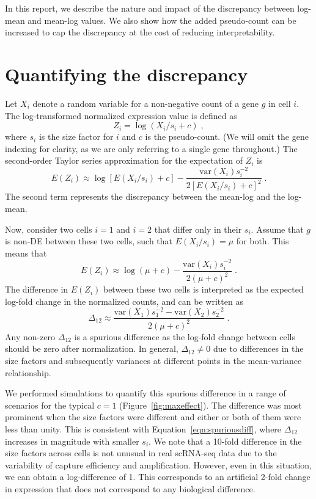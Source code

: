 \documentclass[10pt,letterpaper]{article}
\begin{document}
In this report, we describe the nature and impact of the discrepancy between log-mean and mean-log values.
We also show how the added pseudo-count can be increased to cap the discrepancy at the cost of reducing interpretability.

\section{Quantifying the discrepancy}
Let $X_i$ denote a random variable for a non-negative count of a gene $g$ in cell $i$.
The log-transformed normalized expression value is defined as 
\[
Z_i = \log(X_i / s_i + c) \;,
\]
where $s_i$ is the size factor for $i$ and $c$ is the pseudo-count.
(We will omit the gene indexing for clarity, as we are only referring to a single gene throughout.)
The second-order Taylor series approximation for the expectation of $Z_i$ is
\[
E(Z_i) \approx \log[E(X_i/s_i) + c] - \frac{\mbox{var}(X_i)s_i^{-2}}{2[E(X_i/s_i) + c]^2} \;.
\]
The second term represents the discrepancy between the mean-log and the log-mean.

Now, consider two cells $i=1$ and $i=2$ that differ only in their $s_i$.
Assume that $g$ is non-DE between these two cells, such that $E(X_i/s_i)=\mu$ for both.
This means that
\[
E(Z_i) \approx \log(\mu + c) - \frac{\mbox{var}(X_i)s_i^{-2}}{2(\mu + c)^2} \;.
\]
The difference in $E(Z_i)$ between these two cells is interpreted as the expected log-fold change in the normalized counts, and can be written as
\begin{equation}
\Delta_{12} \approx \frac{\mbox{var}(X_1)s_1^{-2} -  \mbox{var}(X_2)s_2^{-2}}{2(\mu + c)^2} \;. \label{eqn:spuriousdiff}
\end{equation}
Any non-zero $\Delta_{12}$ is a spurious difference as the log-fold change between cells should be zero after normalization.
In general, $\Delta_{12}\neq 0$ due to differences in the size factors and subsequently variances at different points in the mean-variance relationship.

We performed simulations to quantify this spurious difference in a range of scenarios for the typical $c=1$ (Figure~\ref{fig:maxeffect}).
The difference was most prominent when the size factors were different and either or both of them were less than unity.
This is consistent with Equation~\ref{eqn:spuriousdiff}, where $\Delta_{12}$ increases in magnitude with smaller $s_i$.
We note that a 10-fold difference in the size factors across cells is not unusual in real scRNA-seq data \cite{lun2016pooling} due to the variability of capture efficiency and amplification.
However, even in this situation, we can obtain a log-difference of 1.
This corresponds to an artificial 2-fold change in expression that does not correspond to any biological difference.
\end{document}
